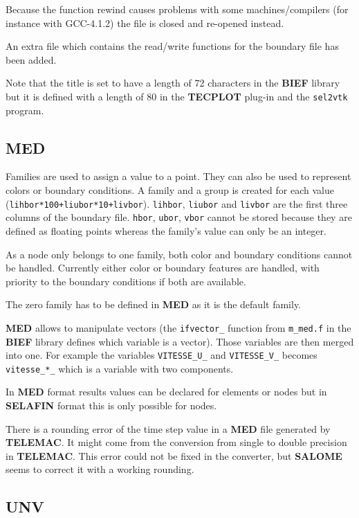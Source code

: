 \documentclass[a4paper,10pt]{article}
\newcommand{\tel}{\textbf{TELEMAC}\xspace}
\newcommand{\bief}{\textbf{BIEF}\xspace}
\newcommand{\slf}{\textbf{SELAFIN}\xspace}
\newcommand{\sal}{\textbf{SALOME}\xspace}
\newcommand{\unv}{\textbf{UNV}\xspace}
\newcommand{\med}{\textbf{MED}\xspace}
\newcommand{\tecplot}{\textbf{TECPLOT}\xspace}
\begin{document}
Because the function rewind causes problems with some machines/compilers (for instance with GCC-4.1.2) the file is closed and re-opened instead.

An extra file which contains the read/write functions for the boundary file has been added.

Note that the title is set to have a length of 72 characters in the \bief library but it is defined with a length of 80 in the \tecplot plug-in and the \verb+sel2vtk+ program.

\subsection{\med}

Families are used to assign a value to a point. They can also be used to represent colors or boundary conditions.
A family and a group is created for each value (\verb?lihbor*100+liubor*10+livbor?). \verb+lihbor+, \verb+liubor+ and \verb+livbor+ are the first three columns of the
boundary file. \verb+hbor+, \verb+ubor+, \verb+vbor+ cannot be stored because they are defined as floating points whereas the family's value can only be an integer.

As a node only belongs to one family, both color and boundary conditions cannot be handled.
Currently either color or boundary features are handled, with priority to the boundary conditions if both are 
available.

The zero family has to be defined in \med as it is the default family.

\med allows to manipulate vectors (the \verb+ifvector_+ function from \verb+m_med.f+ in the \bief library defines which 
variable is a vector). Those variables are then merged into one. For example the variables \verb+VITESSE_U_+ and 
\verb+VITESSE_V_+ becomes \verb+vitesse_*_+ which is a variable with two components.

In \med format results values can be declared for elements or nodes but in \slf format this is only possible for nodes.

There is a rounding error of the time step value in a \med file generated by \tel. It might come from the
conversion from single to double precision in \tel. This error could not be fixed in the converter, but \sal seems to correct it with a working rounding.

\subsection{\unv}
\end{document}
